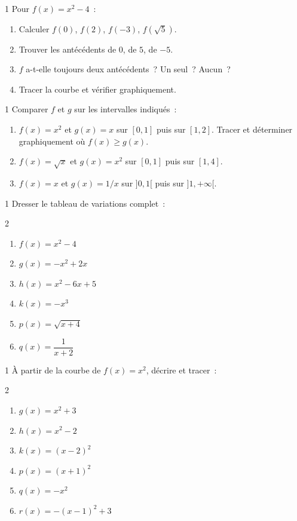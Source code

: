 \begin{exo}{1}
Pour $f(x) = x^2 - 4$~:
\begin{enumerate}
  \item Calculer $f(0)$, $f(2)$, $f(-3)$, $f(\sqrt{5})$.
  \item Trouver les ant\'ec\'edents de $0$, de $5$, de $-5$.
  \item $f$ a-t-elle toujours deux ant\'ec\'edents~? Un seul~? Aucun~?
  \item Tracer la courbe et v\'erifier graphiquement.
\end{enumerate}
\end{exo}

\begin{exo}{1}
Comparer $f$ et $g$ sur les intervalles indiqu\'es~:
\begin{enumerate}
  \item $f(x)=x^2$ et $g(x)=x$ sur $[0,1]$ puis sur $[1,2]$.
        Tracer et d\'eterminer graphiquement o\`u $f(x)\geq g(x)$.
  \item $f(x)=\sqrt{x}$ et $g(x)=x^2$ sur $[0,1]$ puis sur $[1,4]$.
  \item $f(x)=x$ et $g(x)=1/x$ sur $]0,1[$ puis sur $]1,+\infty[$.
\end{enumerate}
\end{exo}

\begin{exo}{1}
Dresser le tableau de variations complet~:
\begin{multicols}{2}
\begin{enumerate}
  \item $f(x) = x^2 - 4$
  \item $g(x) = -x^2 + 2x$
  \item $h(x) = x^2 - 6x + 5$
  \item $k(x) = -x^3$
  \item $p(x) = \sqrt{x+4}$
  \item $q(x) = \dfrac{1}{x+2}$
\end{enumerate}
\end{multicols}
\end{exo}

\begin{exo}{1}
\`A partir de la courbe de $f(x)=x^2$, d\'ecrire et tracer~:
\begin{multicols}{2}
\begin{enumerate}
  \item $g(x) = x^2 + 3$
  \item $h(x) = x^2 - 2$
  \item $k(x) = (x-2)^2$
  \item $p(x) = (x+1)^2$
  \item $q(x) = -x^2$
  \item $r(x) = -(x-1)^2 + 3$
\end{enumerate}
\end{multicols}
\end{exo}

